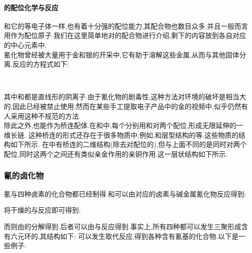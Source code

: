 \documentclass{ctexart}
\begin{document}
\paragraph{的配位化学与反应}
和它的等电子体一样,也有着十分强的配位能力,其配合物也数目众多,并且一般而言用作为配位原子.我们在这里简单地对的配合物进行介绍,剩下的内容放到各自对应的中心元素中.\\
\indent 氰化物曾经被大量用于金和银的开采中,它有助于溶解这些金属,从而与其他固体分离.反应的方程式如下:
\begin{center}
    \\
\end{center}
其中\ce{[Au(CN)2]-}和\ce{[Ag(CN)2]-}都是直线形的阴离子.由于氰化物的剧毒性,这种方法对环境的破坏是相当大的,因此已经被禁止使用.然而在某些手工提取电子产品中的金的视频中,似乎仍然有人采用这种不规范的方法.\\
\indent 除此之外,也能作为桥连配体.在和中,每个分别用和对两个配位,形成无限延伸的一维长链.
这种桥连的形式还存在于很多物质中,例如,和层型结构的等.这些物质的结构如下所示.
在中有桥连的二维结构(除去对配位的),但与上面不同的是同时对两个配位,同时这两个之间还有类似亲金作用的亲铜作用.这一层状结构如下所示.
\subsubsection{氰的卤化物}
氰与四种卤素的化合物都已经制得.和可以由对应的卤素与碱金属氰化物反应得到:
\begin{center}
\end{center}
将干燥的与反应即可得到:
\begin{center}
\end{center}
而则由的分解得到.后者可以由与反应得到.事实上,所有四种都可以发生三聚形成含有六元环的,其结构如下:
可以发生取代反应,得到各种含有氰基的化合物.以下是一些例子:
\begin{center}
    \\
    \\
\end{center}
\end{document}
